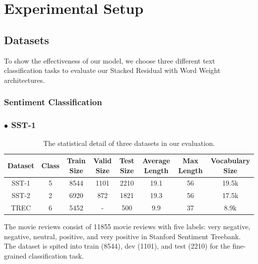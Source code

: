 \documentclass[senior]{IPSstyle}
\begin{document}


\chapter{Experimental Setup}
\section{Datasets}

To show the effectiveness of our model, we choose three different text classification tasks to evaluate our Stacked Residual with Word Weight architectures.

\subsection{Sentiment Classification}
\subsection*{$\bullet$ SST-1}

\begin{table}[t]
\renewcommand{\arraystretch}{1.2}
\caption{The statistical detail of three datasets in our evaluation.}
\label{outcome}
\begin{center}
\begin{tabular}{|c|c|c|c|c|c|c|c|}
\hline
\multicolumn{1}{|c|}{Dataset}
&\multicolumn{1}{c|}{Class}
&\multicolumn{1}{c|}{Train Size}
&\multicolumn{1}{c|}{Valid Size}
&\multicolumn{1}{c|}{Test Size}
&\multicolumn{1}{c|}{Average Length}
&\multicolumn{1}{c|}{Max Length}
&\multicolumn{1}{c|}{Vocabulary Size}\\
\hline
SST-1	&	5	&	8544		&	1101		&	2210		&	19.1		&	56		&	19.5k\\	\hline
SST-2	&	2	&	6920		&	872		&	1821		&	19.3		&	56		&	17.5k\\	\hline
TREC		&	6	&	5452		&	-		&	500		&	9.9		&	37		&	8.9k\\	\hline
\end{tabular}
\end{center}
\label{result1}
\end{table}

The movie reviews consist of 11855 movie reviews with five labels: very negative, negative, neutral, positive, and very positive in Stanford Sentiment Treebank\cite{socher2013recursive}. The dataset is spited into train (8544), dev (1101), and test (2210) for the fine-grained classification task. 
\end{document}
